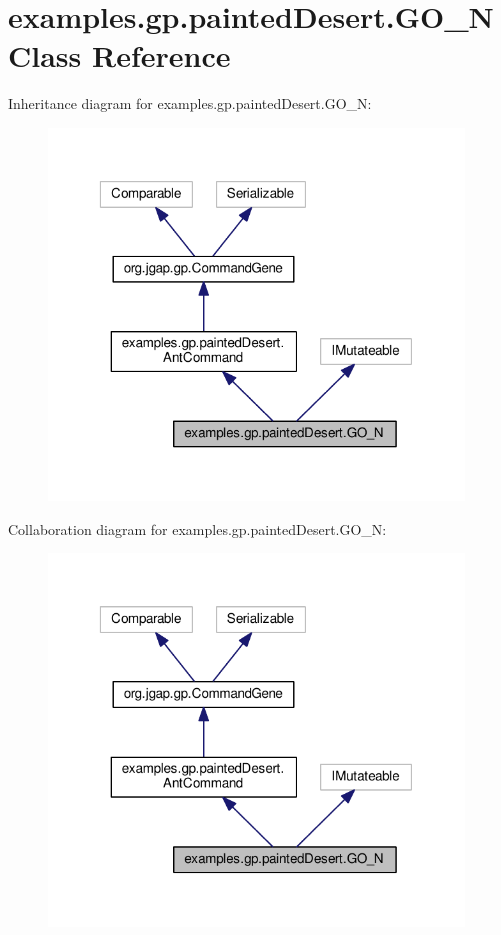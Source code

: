 \hypertarget{classexamples_1_1gp_1_1painted_desert_1_1_g_o___n}{\section{examples.\-gp.\-painted\-Desert.\-G\-O\-\_\-\-N Class Reference}
\label{classexamples_1_1gp_1_1painted_desert_1_1_g_o___n}
}


Inheritance diagram for examples.\-gp.\-painted\-Desert.\-G\-O\-\_\-\-N\-:
\nopagebreak
\begin{figure}[H]
\begin{center}
\leavevmode
\includegraphics[width=313pt]{classexamples_1_1gp_1_1painted_desert_1_1_g_o___n__inherit__graph}
\end{center}
\end{figure}


Collaboration diagram for examples.\-gp.\-painted\-Desert.\-G\-O\-\_\-\-N\-:
\nopagebreak
\begin{figure}[H]
\begin{center}
\leavevmode
\includegraphics[width=313pt]{classexamples_1_1gp_1_1painted_desert_1_1_g_o___n__coll__graph}
\end{center}
\end{figure}
